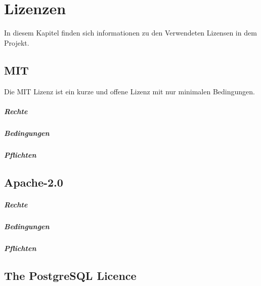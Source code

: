 \chapter{Lizenzen}

In diesem Kapitel finden sich informationen zu den Verwendeten Lizensen in dem Projekt.

\section{MIT}\label{sec:mit}
Die MIT Lizenz ist ein kurze und offene Lizenz mit nur minimalen Bedingungen.

\paragraph{Rechte}

\paragraph{Bedingungen}

\paragraph{Pflichten}

\section{Apache-2.0}\label{sec:apache-2.0}

\paragraph{Rechte}

\paragraph{Bedingungen}

\paragraph{Pflichten}


\section{The PostgreSQL Licence}\label{sec:the-postgresql-licence}

